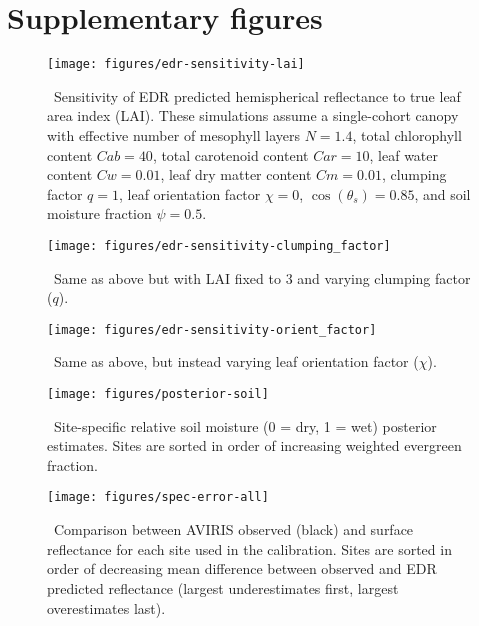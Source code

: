 \section{Supplementary figures}

\begin{figure}[ht]
  \centering
  \texttt{[image: figures/edr-sensitivity-lai]}
  \caption{\label{fig:edr-sensitivity-lai}\
    Sensitivity of EDR predicted hemispherical reflectance to true leaf area index (LAI).
    These simulations assume a single-cohort canopy with
    effective number of mesophyll layers $N = 1.4$,
    total chlorophyll content $Cab = 40$,
    total carotenoid content $Car = 10$,
    leaf water content $Cw = 0.01$,
    leaf dry matter content $Cm = 0.01$,
    clumping factor $q = 1$,
    leaf orientation factor $\chi = 0$,
    $\cos(\theta_{s}) = 0.85$,
    and soil moisture fraction $\psi = 0.5$.
  }
\end{figure}

\clearpage

\begin{figure}[ht]
  \centering
  \texttt{[image: figures/edr-sensitivity-clumping\_factor]}
  \caption{\label{fig:edr-sensitivity-clumping}\
    Same as above but with LAI fixed to 3 and varying clumping factor ($q$).
  }
\end{figure}

\clearpage

\begin{figure}[ht]
  \centering
  \texttt{[image: figures/edr-sensitivity-orient\_factor]}
  \caption{\label{fig:edr-sensitivity-orient}\
    Same as above, but instead varying leaf orientation factor ($\chi$).
  }
\end{figure}

\clearpage

\begin{figure}[ht]
  \centering
  \texttt{[image: figures/posterior-soil]}
  \caption{\label{fig:posterior-soil}\
    Site-specific relative soil moisture (0 = dry, 1 = wet) posterior estimates.
    Sites are sorted in order of increasing weighted evergreen fraction.
  }
\end{figure}

\clearpage

\begin{figure}
  \centering
  \texttt{[image: figures/spec-error-all]}
  \caption{\label{fig:spec-error-allsites}\
    Comparison between AVIRIS observed (black) and
    surface reflectance for each site used in the calibration.
    Sites are sorted in order of decreasing mean difference between observed and EDR predicted reflectance
    (largest underestimates first, largest overestimates last).
  }
\end{figure}

